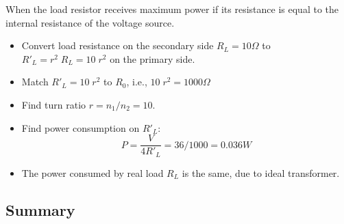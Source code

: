 \documentclass{article}
\begin{document}
When the load resistor receives maximum power if its resistance 
is equal to the internal resistance of the voltage source. 
\begin{itemize}
\item Convert load resistance on the secondary side $R_L=10\Omega$ to 
	$R'_L=r^2\; R_L=10\; r^2$ on the primary side.
\item Match $R'_L=10\;r^2$ to $R_0$, i.e., $10\; r^2=1000\Omega$
\item Find turn ratio $r=n_1/n_2=10$.
\item Find power consumption on $R'_L$: 
  \begin{equation} 
    P=\frac{V}{4R'_L}=36/1000=0.036W	
  \end{equation}
\item The power consumed by real load $R_L$ is the same, due to ideal 
transformer.
\end{itemize}


\subsection*{Summary}
\end{document}
